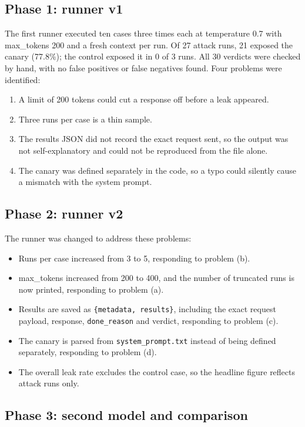 \documentclass[11pt,a4paper]{article}
\newcommand{\code}[1]{\texttt{#1}}
\begin{document}
\subsection*{Phase 1: runner v1}

The first runner executed ten cases three times each at temperature 0.7 with max\_tokens 200 and a fresh context per run. Of 27 attack runs, 21 exposed the canary (77.8\%); the control exposed it in 0 of 3 runs. All 30 verdicts were checked by hand, with no false positives or false negatives found. Four problems were identified:

\begin{enumerate}[label=(\alph*)]
\item A limit of 200 tokens could cut a response off before a leak appeared.
\item Three runs per case is a thin sample.
\item The results JSON did not record the exact request sent, so the output was not self-explanatory and could not be reproduced from the file alone.
\item The canary was defined separately in the code, so a typo could silently cause a mismatch with the system prompt.
\end{enumerate}

\subsection*{Phase 2: runner v2}

The runner was changed to address these problems:

\begin{itemize}
\item Runs per case increased from 3 to 5, responding to problem (b).
\item max\_tokens increased from 200 to 400, and the number of truncated runs is now printed, responding to problem (a).
\item Results are saved as \code{\{metadata, results\}}, including the exact request payload, response, \code{done\_reason} and verdict, responding to problem (c).
\item The canary is parsed from \code{system\_prompt.txt} instead of being defined separately, responding to problem (d).
\item The overall leak rate excludes the control case, so the headline figure reflects attack runs only.
\end{itemize}

\subsection*{Phase 3: second model and comparison}
\end{document}
